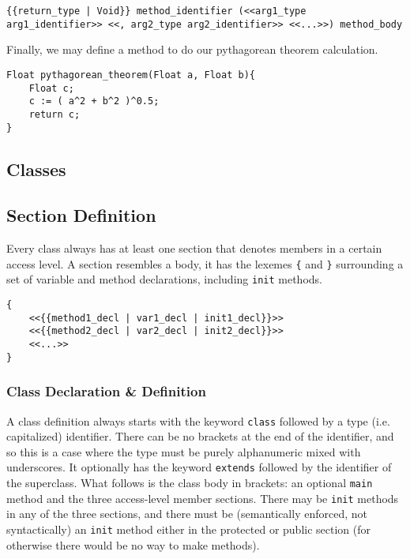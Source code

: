 \begin{lstlisting}
{{return_type | Void}} method_identifier (<<arg1_type arg1_identifier>> <<, arg2_type arg2_identifier>> <<...>>) method_body
\end{lstlisting}

Finally, we may define a method to do our pythagorean theorem calculation.

\begin{lstlisting}[backgroundcolor=\color{tintedorange},caption=Method Definition for the Pythagorean Theorem]
Float pythagorean_theorem(Float a, Float b){
    Float c;
    c := ( a^2 + b^2 )^0.5;
    return c;
}
\end{lstlisting}

\subsection{Classes}

\subsection{Section Definition}
Every class always has at least one section that denotes members in a certain access level. A section resembles a body, it has the lexemes \verb!{! and \verb!}! surrounding a set of variable and method declarations, including \verb!init! methods.

\begin{lstlisting}
{
	<<{{method1_decl | var1_decl | init1_decl}}>>
	<<{{method2_decl | var2_decl | init2_decl}}>>
	<<...>>
}
\end{lstlisting}

\subsubsection{Class Declaration \& Definition}
A class definition always starts with the keyword \verb!class! followed by a type (i.e. capitalized) identifier. There can be no brackets at the end of the identifier, and so this is a case where the type must be purely alphanumeric mixed with underscores. It optionally has the keyword \verb!extends! followed by the identifier of the superclass. What follows is the class body in brackets: an optional \verb!main! method and the three access-level member sections. There may be \verb!init! methods in any of the three sections, and there must be (semantically enforced, not syntactically) an \verb!init! method either in the protected or public section (for otherwise there would be no way to make methods).

